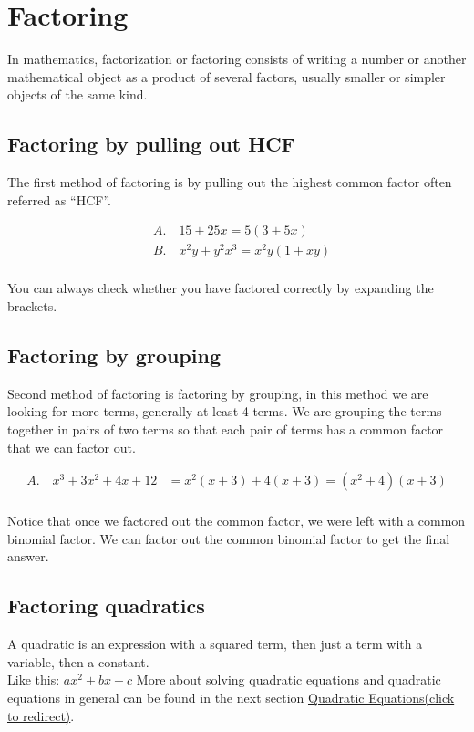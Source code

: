\section{Factoring}
In mathematics, factorization or factoring consists of writing a number or another mathematical object as a product of several factors, usually smaller or simpler objects of the same kind. \\

\subsection{Factoring by pulling out HCF}

The first method of factoring is by pulling out the highest common factor often referred as “HCF”. 

\begin{align*}
    &A. \quad 15 + 25x = 5(3 + 5x) \\
    &B. \quad x^2y + y^2x^3 = x^2y(1 + xy) \\
\end{align*}

You can always check whether you have factored correctly by expanding the brackets.

\subsection{Factoring by grouping}
Second method of factoring is factoring by grouping, in this method we are looking for more terms, generally at least 4 terms. We are grouping the terms together in pairs of two terms so that each pair of terms has a common factor that we can factor out. 

\begin{align*}
    A. \quad x^3 + 3x^2 + 4x + 12 &= x^2(x + 3) + 4(x + 3) = (x^2 + 4)(x + 3) \\
\end{align*}

Notice that once we factored out the common factor, we were left with a common binomial factor. We can factor out the common binomial factor to get the final answer.

\subsection{Factoring quadratics}
A quadratic is an expression with a squared term, then just a term with a variable, then a constant. 
\\ Like this: $ax^2 + bx + c$ 
More about solving quadratic equations and quadratic equations in general can be found in the next section \hyperref[sec:quadratic-equations]{Quadratic Equations(click to redirect)}.


